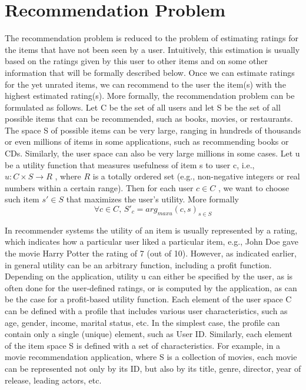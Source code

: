 \section{Recommendation Problem}
The recommendation problem is reduced to the problem of estimating ratings for the items that have not been seen by a user. Intuitively, this estimation is usually based on the ratings given by this user to other items and on some other information that will be formally described below. Once we can estimate ratings for the yet unrated items, we can recommend to the user the item(s) with the highest estimated rating(s).
More formally, the recommendation problem can be formulated as follows. Let C be the set of all users and let S be the set of all possible items that can be recommended, such as books, movies, or restaurants. The space S of possible items can be very large, ranging in hundreds of thousands or even millions of items in some applications, such as recommending books or CDs.
Similarly, the user space can also be very large millions in some cases. Let u be a utility function that measures usefulness of item s to user c, i.e., $u :C \times S \rightarrow R$ , where $R$ is a totally ordered set (e.g., non-negative integers or real numbers within a certain range). Then for each user $c\in C$ , we want to choose such item $s' \in S$ that maximizes the user's utility. More formally
\begin{equation} \label{eq:1}
\forall c \in C,\, S'_c = arg_{max u} (c,s)_{s \in S}
\end{equation}

In recommender systems the utility of an item is usually represented by a rating, which indicates how a particular user liked a particular item, e.g., John Doe gave the movie Harry Potter the rating of 7 (out of 10). However, as indicated earlier, in general utility can be an arbitrary function, including a profit function. Depending on the application, utility u can either be specified by the user, as is often done for the user-defined ratings, or is computed by the application, as can be the case for a profit-based utility function.
Each element of the user space C can be defined with a profile that includes various user characteristics, such as age, gender, income, marital status, etc. In the simplest case, the profile can contain only a single (unique) element, such as User ID. Similarly, each element of the item space S is defined with a set of characteristics. For example, in a movie  recommendation application, where S is a collection of movies, each movie can be represented not only by its ID, but also by its title, genre, director, year of release, leading actors, etc.

